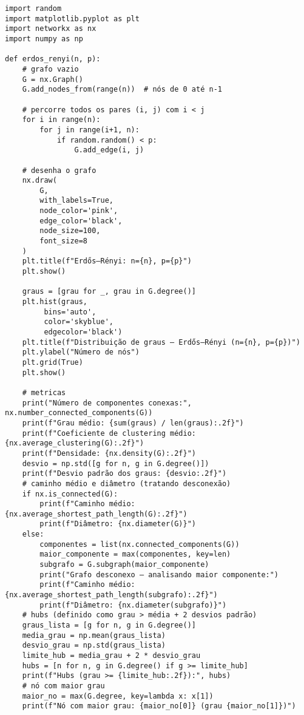 \documentclass[a4paper]{article}
\begin{document}
\begin{verbatim}
import random
import matplotlib.pyplot as plt
import networkx as nx
import numpy as np

def erdos_renyi(n, p):
    # grafo vazio
    G = nx.Graph()
    G.add_nodes_from(range(n))  # nós de 0 até n-1

    # percorre todos os pares (i, j) com i < j
    for i in range(n):
        for j in range(i+1, n):
            if random.random() < p:
                G.add_edge(i, j)

    # desenha o grafo
    nx.draw(
        G,
        with_labels=True,
        node_color='pink',
        edge_color='black',
        node_size=100,
        font_size=8
    )
    plt.title(f"Erdős–Rényi: n={n}, p={p}")
    plt.show()

    graus = [grau for _, grau in G.degree()]
    plt.hist(graus, 
         bins='auto',
         color='skyblue', 
         edgecolor='black')
    plt.title(f"Distribuição de graus — Erdős–Rényi (n={n}, p={p})")
    plt.ylabel("Número de nós")
    plt.grid(True)
    plt.show()

    # metricas
    print("Número de componentes conexas:", nx.number_connected_components(G))
    print(f"Grau médio: {sum(graus) / len(graus):.2f}")
    print(f"Coeficiente de clustering médio: {nx.average_clustering(G):.2f}")
    print(f"Densidade: {nx.density(G):.2f}")
    desvio = np.std([g for n, g in G.degree()])
    print(f"Desvio padrão dos graus: {desvio:.2f}")
    # caminho médio e diâmetro (tratando desconexão)
    if nx.is_connected(G):
        print(f"Caminho médio: {nx.average_shortest_path_length(G):.2f}")
        print(f"Diâmetro: {nx.diameter(G)}")
    else:
        componentes = list(nx.connected_components(G))
        maior_componente = max(componentes, key=len)
        subgrafo = G.subgraph(maior_componente)
        print("Grafo desconexo — analisando maior componente:")
        print(f"Caminho médio: {nx.average_shortest_path_length(subgrafo):.2f}")
        print(f"Diâmetro: {nx.diameter(subgrafo)}")
    # hubs (definido como grau > média + 2 desvios padrão)
    graus_lista = [g for n, g in G.degree()]
    media_grau = np.mean(graus_lista)
    desvio_grau = np.std(graus_lista)
    limite_hub = media_grau + 2 * desvio_grau
    hubs = [n for n, g in G.degree() if g >= limite_hub]
    print(f"Hubs (grau >= {limite_hub:.2f}):", hubs)
    # nó com maior grau
    maior_no = max(G.degree, key=lambda x: x[1])
    print(f"Nó com maior grau: {maior_no[0]} (grau {maior_no[1]})")
\end{verbatim}
\end{document}
